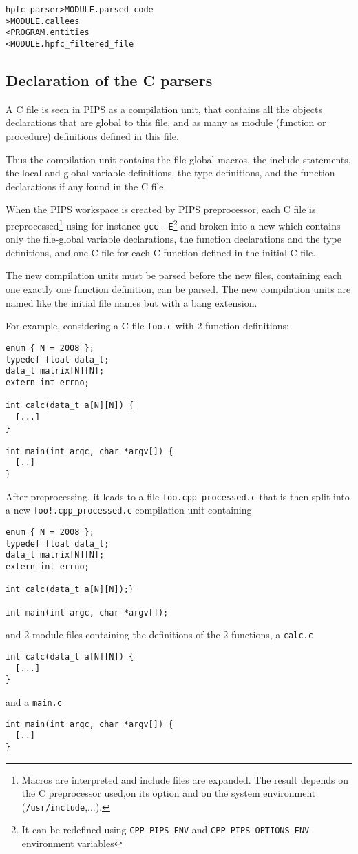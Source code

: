 \documentclass[a4paper]{report}
\newenvironment{PipsMake}{\begin{alltt}}{\end{alltt}}
\begin{document}
\begin{PipsMake}
hpfc_parser                     > MODULE.parsed_code
                                > MODULE.callees
        < PROGRAM.entities
        < MODULE.hpfc_filtered_file
\end{PipsMake}


\subsection{Declaration of the C parsers}

A C file is seen in PIPS as a compilation unit, that contains all the
objects declarations that are global to this file, and as many as module
(function or procedure) definitions defined in this file.

Thus the compilation unit contains the file-global macros, the include
statements, the local and global variable definitions, the type
definitions, and the function declarations if any found in the C file.

When the PIPS workspace is created by PIPS preprocessor, each C file is
preprocessed\footnote{Macros are interpreted and include files are
  expanded. The result depends on the C preprocessor used,on its option
  and on the system environment (\texttt{/usr/include},...).} using for
instance \texttt{gcc -E}\footnote{It can be redefined using
  \texttt{CPP\_PIPS\_ENV} and \texttt{CPP\ PIPS\_OPTIONS\_ENV} environment
  variables} and broken into a new  which contains
only the file-global variable declarations, the function declarations and
the type definitions, and one C file for each C function defined in the
initial C file.

The new compilation units must be parsed before the new files, containing
each one exactly one function definition, can be parsed. The new
compilation units are named like the initial file names but with a bang
extension.

For example, considering a C file \verb|foo.c| with 2 function
definitions:
\begin{lstlisting}
enum { N = 2008 };
typedef float data_t;
data_t matrix[N][N];
extern int errno;

int calc(data_t a[N][N]) {
  [...]
}

int main(int argc, char *argv[]) {
  [..]
}
\end{lstlisting}
After preprocessing, it leads to a file \verb|foo.cpp_processed.c| that is
then split into a new \verb|foo!.cpp_processed.c| compilation unit
containing
\begin{lstlisting}
enum { N = 2008 };
typedef float data_t;
data_t matrix[N][N];
extern int errno;

int calc(data_t a[N][N]);}

int main(int argc, char *argv[]);
\end{lstlisting}
and 2 module files containing the definitions of the 2 functions, a
\verb|calc.c|
\begin{lstlisting}
int calc(data_t a[N][N]) {
  [...]
}
\end{lstlisting}
and a \verb|main.c|
\begin{lstlisting}
int main(int argc, char *argv[]) {
  [..]
}
\end{lstlisting}
\end{document}
